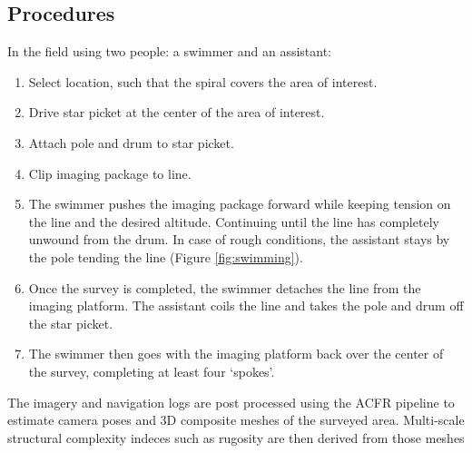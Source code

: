 \subsection{Procedures}

In the field using two people: a swimmer and an assistant:\begin{enumerate}
\item Select location, such that the spiral covers the area of interest.
\item Drive star picket at the center of the area of interest. 
\item Attach pole and drum to star picket.
\item Clip imaging package to line.
\item The swimmer pushes the imaging package forward while keeping tension on the line and the desired altitude. Continuing until the line has completely unwound from the drum. In case of rough conditions, the assistant stays by the pole tending the line (Figure \ref{fig:swimming}).
\item Once the survey is completed, the swimmer detaches the line from the imaging platform. The assistant coils the line and takes the pole and drum off the star picket. 
\item The swimmer then goes with the imaging platform back over the center of the survey, completing at least four `spokes'.  
\end{enumerate}

The imagery and navigation logs are post processed using the ACFR pipeline \cite{Johnson_Roberson_2010} \cite{Mahon_2008} \cite{Johnson_Roberson_2013} to estimate camera poses and 3D composite meshes of the surveyed area. Multi-scale structural complexity indeces such as rugosity are then derived from those meshes \cite{Friedman_2012} 
